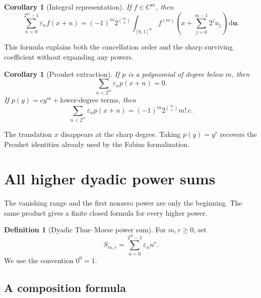 \documentclass[11pt,oneside]{article}
\newtheorem{corollary}[theorem]{Corollary}
\theoremstyle{definition}
\newtheorem{definition}[theorem]{Definition}
\theoremstyle{remark}
\newcommand{\dd}{\,\mathrm d}
\begin{document}
\begin{corollary}[Integral representation]
\label{cor:integral-difference}
If \(f\in C^m\), then
\begin{equation}
 \sum_{n=0}^{2^m-1}\varepsilon_nf(x+n)
 =(-1)^m2^{\binom m2}
  \int_{[0,1]^m}
  f^{(m)}\!\left(x+\sum_{j=0}^{m-1}2^ju_j\right)\dd\bm u.
 \label{eq:integral-difference}
\end{equation}
\end{corollary}

This formula explains both the cancellation order and the sharp surviving
coefficient without expanding any powers.

\begin{corollary}[Prouhet extraction]
\label{cor:prouhet-extraction}
If \(p\) is a polynomial of degree below \(m\), then
\begin{equation}
 \sum_{n<2^m}\varepsilon_np(x+n)=0.
 \label{eq:prouhet-general}
\end{equation}
If \(p(y)=cy^m+\text{lower-degree terms}\), then
\begin{equation}
 \sum_{n<2^m}\varepsilon_np(x+n)
 =(-1)^m2^{\binom m2}m!\,c.
 \label{eq:prouhet-leading}
\end{equation}
\end{corollary}

The translation \(x\) disappears at the sharp degree.  Taking
\(p(y)=y^r\) recovers the Prouhet identities already used by the Fabius
formalization.

\section{All higher dyadic power sums}
\label{sec:power-sums}

The vanishing range and the first nonzero power are only the beginning.  The
same product gives a finite closed formula for every higher power.

\begin{definition}[Dyadic Thue--Morse power sum]
For \(m,r\ge0\), set
\begin{equation}
 S_{m,r}=\sum_{n=0}^{2^m-1}\varepsilon_n n^r.
 \label{eq:S-def}
\end{equation}
We use the convention \(0^0=1\).
\end{definition}

\subsection{A composition formula}
\end{document}
